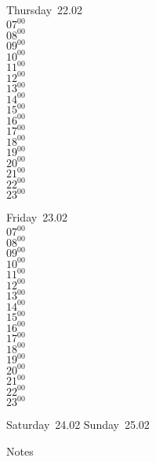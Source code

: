 \documentclass[11pt, a4paper]{book}\usepackage[]{graphicx}\usepackage[]{color}
\begin{document}
\begin{weekdaybox}
  Thursday~22.02\\
  { 
  \vfill
  $07^{00}$\\
$08^{00}$\\
$09^{00}$\\
$10^{00}$\\
$11^{00}$\\
$12^{00}$\\
$13^{00}$\\
$14^{00}$\\
$15^{00}$\\
$16^{00}$\\
$17^{00}$\\
$18^{00}$\\
$19^{00}$\\
$20^{00}$\\
$21^{00}$\\
$22^{00}$\\
$23^{00}$\\
  }
\end{weekdaybox} 
\begin{weekdaybox}
  Friday~23.02\\
  { 
  \vfill
  $07^{00}$\\
$08^{00}$\\
$09^{00}$\\
$10^{00}$\\
$11^{00}$\\
$12^{00}$\\
$13^{00}$\\
$14^{00}$\\
$15^{00}$\\
$16^{00}$\\
$17^{00}$\\
$18^{00}$\\
$19^{00}$\\
$20^{00}$\\
$21^{00}$\\
$22^{00}$\\
$23^{00}$\\
  }
\end{weekdaybox}
\begin{weekendbox}
  Saturday~24.02
  \tcblower
  Sunday~25.02
\end{weekendbox} %
\begin{notebox}
  Notes
\end{notebox}
\clearpage
\end{document}
